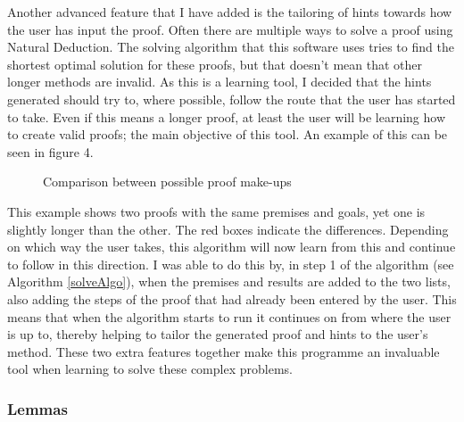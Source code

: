Another advanced feature that I have added is the tailoring of hints towards how the user has input the proof. Often there are multiple ways to solve a proof using Natural Deduction. The solving algorithm that this software uses tries to find the shortest optimal solution for these proofs, but that doesn't mean that other longer methods are invalid. As this is a learning tool, I decided that the hints generated should try to, where possible, follow the route that the user has started to take. Even if this means a longer proof, at least the user will be learning how to create valid proofs; the main objective of this tool. An example of this can be seen in figure 4.

\begin{figure}[!ht]
	\centering
	\caption{Comparison between possible proof make-ups}
\end{figure}

This example shows two proofs with the same premises and goals, yet one is slightly longer than the other. The red boxes indicate the differences. Depending on which way the user takes, this algorithm will now learn from this and continue to follow in this direction. I was able to do this by, in step 1 of the algorithm (see Algorithm \ref{solveAlgo}), when the premises and results are added to the two lists, also adding the steps of the proof that had already been entered by the user. This means that when the algorithm starts to run it continues on from where the user is up to, thereby helping to tailor the generated proof and hints to the user's method. These two extra features together make this programme an invaluable tool when learning to solve these complex problems. 

\subsubsection{Lemmas \label{lemmas}}

